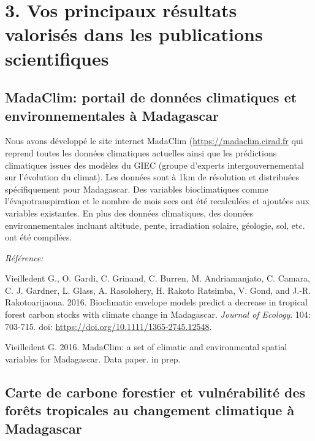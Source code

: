 \documentclass[12pt,]{article}
\begin{document}
\hypertarget{vos-principaux-resultats-valorises-dans-les-publications-scientifiques}{%
\section{3. Vos principaux résultats valorisés dans les publications
scientifiques}\label{vos-principaux-resultats-valorises-dans-les-publications-scientifiques}}

\hypertarget{madaclim-portail-de-donnees-climatiques-et-environnementales-a-madagascar}{%
\subsection{MadaClim: portail de données climatiques et
environnementales à
Madagascar}\label{madaclim-portail-de-donnees-climatiques-et-environnementales-a-madagascar}}

Nous avons développé le site internet MadaClim
(\url{https://madaclim.cirad.fr} qui reprend toutes les données
climatiques actuelles ainsi que les prédictions climatiques issues des
modèles du GIEC (groupe d'experts intergouvernemental sur l'évolution du
climat). Les données sont à 1km de résolution et distribuées
spécifiquement pour Madagascar. Des variables bioclimatiques comme
l'évapotranspiration et le nombre de mois secs ont été recalculées et
ajoutées aux variables existantes. En plus des données climatiques, des
données environnementales incluant altitude, pente, irradiation solaire,
géologie, sol, etc. ont été compilées.

\emph{Référence:}

Vieilledent G., O. Gardi, C. Grinand, C. Burren, M. Andriamanjato, C.
Camara, C. J. Gardner, L. Glass, A. Rasolohery, H. Rakoto Ratsimba, V.
Gond, and J.-R. Rakotoarijaona. 2016. Bioclimatic envelope models
predict a decrease in tropical forest carbon stocks with climate change
in Madagascar. \emph{Journal of Ecology}. 104: 703-715. doi:
\url{https://doi.org/10.1111/1365-2745.12548}.

Vieilledent G. 2016. MadaClim: a set of climatic and environmental
spatial variables for Madagascar. Data paper. in prep.

\hypertarget{carte-de-carbone-forestier-et-vulnerabilite-des-forets-tropicales-au-changement-climatique-a-madagascar}{%
\subsection{Carte de carbone forestier et vulnérabilité des forêts
tropicales au changement climatique à
Madagascar}\label{carte-de-carbone-forestier-et-vulnerabilite-des-forets-tropicales-au-changement-climatique-a-madagascar}}
\end{document}
